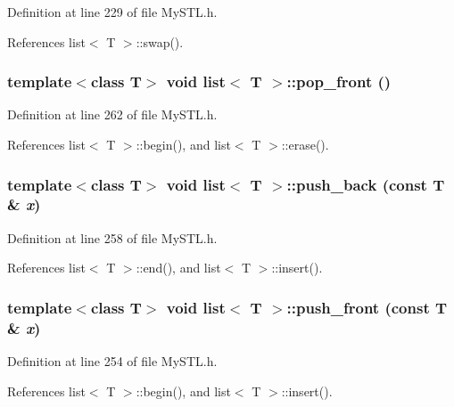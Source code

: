 Definition at line 229 of file MySTL.h.



References list$<$ T $>$::swap().

\subsubsection[{pop\_\-front}]{\setlength{\rightskip}{0pt plus 5cm}template$<$class T$>$ void {\bf list}$<$ T $>$::pop\_\-front ()}\label{classlist_ae9c74ac5775defd29b66beb9aa956a14}


Definition at line 262 of file MySTL.h.



References list$<$ T $>$::begin(), and list$<$ T $>$::erase().

\subsubsection[{push\_\-back}]{\setlength{\rightskip}{0pt plus 5cm}template$<$class T$>$ void {\bf list}$<$ T $>$::push\_\-back (const T \& {\em x})}\label{classlist_aa199b9d85ae081dfad54fb1c4d973aba}


Definition at line 258 of file MySTL.h.



References list$<$ T $>$::end(), and list$<$ T $>$::insert().

\subsubsection[{push\_\-front}]{\setlength{\rightskip}{0pt plus 5cm}template$<$class T$>$ void {\bf list}$<$ T $>$::push\_\-front (const T \& {\em x})}\label{classlist_ab6ceb52fe79372f40fc1cb559600be89}


Definition at line 254 of file MySTL.h.



References list$<$ T $>$::begin(), and list$<$ T $>$::insert().



